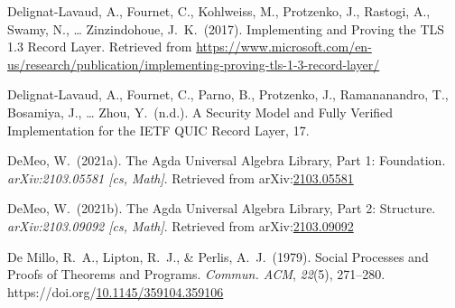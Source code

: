 \documentclass[12pt,twoside]{article}
\begin{document}
{\begin{thebibliography}{1079}
\mdbibitemlabel{}Delignat-Lavaud, A., Fournet, C., Kohlweiss, M., Protzenko, J., Rastogi, A., Swamy, N., … Zinzindohoue, J.~K.~(2017). Implementing and Proving the TLS 1.3 Record Layer. Retrieved from \href{https://www.microsoft.com/en-us/research/publication/implementing-proving-tls-1-3-record-layer/}{{\ttfamily https://\hspace{0pt}www.\hspace{0pt}microsoft.\hspace{0pt}com/\hspace{0pt}en-\hspace{0pt}us/\hspace{0pt}research/\hspace{0pt}publication/\hspace{0pt}implementing-\hspace{0pt}proving-\hspace{0pt}tls-\hspace{0pt}1-\hspace{0pt}3-\hspace{0pt}record-\hspace{0pt}layer/\hspace{0pt}}}%

\mdbibitemlabel{}Delignat-Lavaud, A., Fournet, C., Parno, B., Protzenko, J., Ramananandro, T., Bosamiya, J., … Zhou, Y.~(n.d.). A Security Model and Fully Veriﬁed Implementation for the IETF QUIC Record Layer, 17.%

\mdbibitemlabel{}DeMeo, W.~(2021a). The Agda Universal Algebra Library, Part 1: Foundation. \emph{arXiv:2103.05581 {}[cs, Math]}. Retrieved from arXiv:\href{http://arxiv.org/abs/2103.05581}{2103.05581}%

\mdbibitemlabel{}DeMeo, W.~(2021b). The Agda Universal Algebra Library, Part 2: Structure. \emph{arXiv:2103.09092 {}[cs, Math]}. Retrieved from arXiv:\href{http://arxiv.org/abs/2103.09092}{2103.09092}%

\mdbibitemlabel{}De Millo, R.~A., Lipton, R.~J., \& Perlis, A.~J.~(1979). Social Processes and Proofs of Theorems and Programs. \emph{Commun. ACM}, \emph{22}(5), 271–280. https://doi.org/\href{https://dx.doi.org/10.1145/359104.359106}{10.1145/359104.359106}%


\end{thebibliography}}
\end{document}
